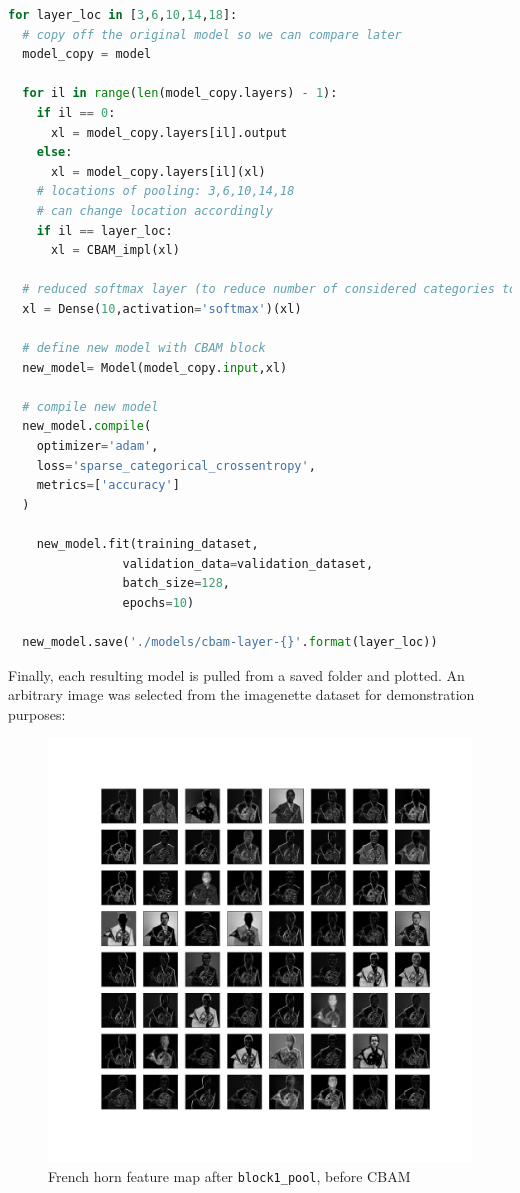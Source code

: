 \documentclass{article}
\begin{document}
\begin{lstlisting}[language=Python]
for layer_loc in [3,6,10,14,18]:
  # copy off the original model so we can compare later
  model_copy = model

  for il in range(len(model_copy.layers) - 1):
    if il == 0:
      xl = model_copy.layers[il].output
    else:
      xl = model_copy.layers[il](xl)
    # locations of pooling: 3,6,10,14,18
    # can change location accordingly
    if il == layer_loc:
      xl = CBAM_impl(xl)

  # reduced softmax layer (to reduce number of considered categories to 10)
  xl = Dense(10,activation='softmax')(xl)

  # define new model with CBAM block
  new_model= Model(model_copy.input,xl)

  # compile new model
  new_model.compile(
    optimizer='adam',
    loss='sparse_categorical_crossentropy',
    metrics=['accuracy']
  )
  
    new_model.fit(training_dataset,
                validation_data=validation_dataset,
                batch_size=128,
                epochs=10)
  
  new_model.save('./models/cbam-layer-{}'.format(layer_loc))
\end{lstlisting}

Finally, each resulting model is pulled from a saved folder and plotted.
An arbitrary image was selected from the imagenette dataset for demonstration purposes:

\begin{figure}[H]
    \centering
    \includegraphics[width=6in]{csci-8920/hw-4/images/horn-pre-CBAM-3-block1_pool.png}
    \caption{French horn feature map after \lstinline{block1_pool}, before CBAM}
    \label{fig:horn_1_pre}
\end{figure}
\end{document}
